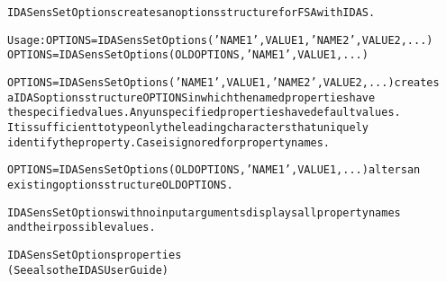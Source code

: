 \begin{alltt}
IDASensSetOptions creates an options structure for FSA with IDAS.

   Usage: OPTIONS = IDASensSetOptions('NAME1',VALUE1,'NAME2',VALUE2,...)
          OPTIONS = IDASensSetOptions(OLDOPTIONS,'NAME1',VALUE1,...)

   OPTIONS = IDASensSetOptions('NAME1',VALUE1,'NAME2',VALUE2,...) creates 
   a IDAS options structure OPTIONS in which the named properties have 
   the specified values. Any unspecified properties have default values. 
   It is sufficient to type only the leading characters that uniquely 
   identify the property. Case is ignored for property names. 
   
   OPTIONS = IDASensSetOptions(OLDOPTIONS,'NAME1',VALUE1,...) alters an 
   existing options structure OLDOPTIONS.
   
   IDASensSetOptions with no input arguments displays all property names 
   and their possible values.
   
IDASensSetOptions properties
(See also the IDAS User Guide)


\end{alltt}
